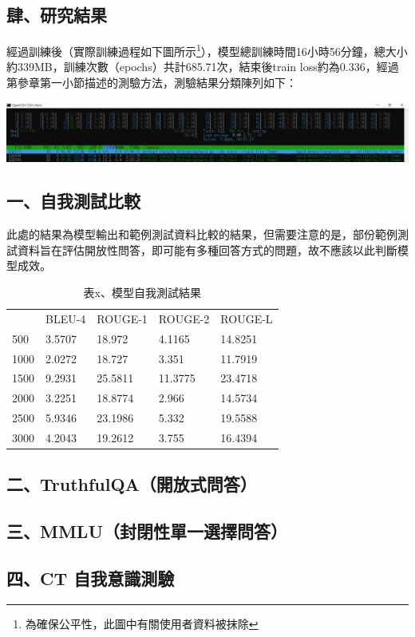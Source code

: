 \documentclass[8pt,a4paper,新細明體,UTF8,natbib]{article}
\begin{document}
\begin{CJK*}{UTF8}{bsmi}
	\section{肆、研究結果}
	經過訓練後（實際訓練過程如下圖所示\footnote{為確保公平性，此圖中有關使用者資料被抹除}），模型總訓練時間16小時56分鐘，總大小約339MB，訓練次數（epochs）共計685.71次，結束後train loss約為0.336，經過第參章第一小節描述的測驗方法，測驗結果分類陳列如下：%
	
	\includegraphics[width=\textwidth]{running}
	\subsection{一、自我測試比較}
	此處的結果為模型輸出和範例測試資料比較的結果，但需要注意的是，部份範例測試資料旨在評估開放性問答，即可能有多種回答方式的問題，故不應該以此判斷模型成效。
	\begin{table}[H]
		\centering
		\caption{表x、模型自我測試結果}
		\begin{tabular}{lllll}
			& BLEU-4 & ROUGE-1 & ROUGE-2 & ROUGE-L  \\
			500  & 3.5707 & 18.972  & 4.1165  & 14.8251  \\
			1000 & 2.0272 & 18.727  & 3.351   & 11.7919  \\
			1500 & 9.2931 & 25.5811 & 11.3775 & 23.4718  \\
			2000 & 3.2251 & 18.8774 & 2.966   & 14.5734  \\
			2500 & 5.9346 & 23.1986 & 5.332   & 19.5588  \\
			3000 & 4.2043 & 19.2612 & 3.755   & 16.4394 
		\end{tabular}
	\end{table}
	\subsection{二、TruthfulQA（開放式問答）}
	\subsection{三、MMLU（封閉性單一選擇問答）}
	\subsection{四、CT 自我意識測驗}

\end{CJK*}
\end{document}

